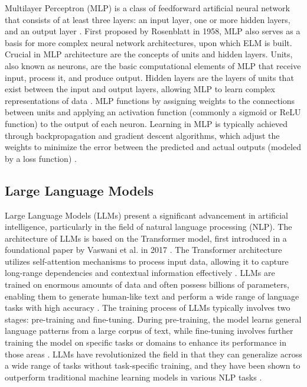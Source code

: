 Multilayer Perceptron (MLP) is a class of feedforward artificial neural network that consists of at least three layers: an input layer, one or more hidden layers, and an output layer \cite{Rosenblatt1958}. First proposed by Rosenblatt in 1958, MLP also serves as a basis for more complex neural network architectures, upon which ELM is built. Crucial in MLP architecture are the concepts of units and hidden layers. Units, also known as neurons, are the basic computational elements of MLP that receive input, process it, and produce output. Hidden layers are the layers of units that exist between the input and output layers, allowing MLP to learn complex representations of data \cite{Rosenblatt1958}. MLP functions by assigning weights to the connections between units and applying an activation function (commonly a sigmoid or ReLU function) to the output of each neuron. Learning in MLP is typically achieved through backpropagation and gradient descent algorithms, which adjust the weights to minimize the error between the predicted and actual outputs (modeled by a loss function) \cite{Haykin1999}.

\subsection{Large Language Models}

Large Language Models (LLMs) present a significant advancement in artificial intelligence, particularly in the field of natural language processing (NLP). The architecture of LLMs is based on the Transformer model, first introduced in a foundational paper by Vaswani et al. in 2017 \cite{Vaswani2017}. The Transformer architecture utilizes self-attention mechanisms to process input data, allowing it to capture long-range dependencies and contextual information effectively \cite{Vaswani2017}. LLMs are trained on enormous amounts of data and often possess billions of parameters, enabling them to generate human-like text and perform a wide range of language tasks with high accuracy \cite{Brown2020}. The training process of LLMs typically involves two stages: pre-training and fine-tuning. During pre-training, the model learns general language patterns from a large corpus of text, while fine-tuning involves further training the model on specific tasks or domains to enhance its performance in those areas \cite{Devlin2018}. LLMs have revolutionized the field in that they can generalize across a wide range of tasks without task-specific training, and they have been shown to outperform traditional machine learning models in various NLP tasks \cite{Brown2020}.

